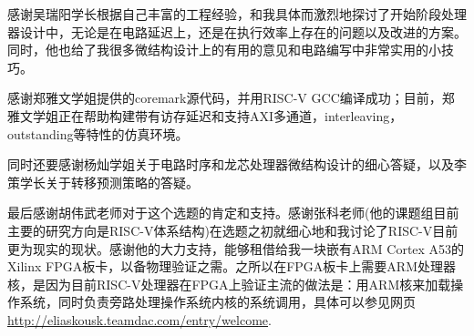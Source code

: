 
感谢吴瑞阳学长根据自己丰富的工程经验，和我具体而激烈地探讨了开始阶段处理器设计中，无论是在电路延迟上，还是在执行效率上存在的问题以及改进的方案。同时，他也给了我很多微结构设计上的有用的意见和电路编写中非常实用的小技巧。

感谢郑雅文学姐提供的coremark源代码，并用RISC-V GCC编译成功；目前，郑雅文学姐正在帮助构建带有访存延迟和支持AXI多通道，interleaving，outstanding等特性的仿真环境。

同时还要感谢杨灿学姐关于电路时序和龙芯处理器微结构设计的细心答疑，以及李策学长关于转移预测策略的答疑。

最后感谢胡伟武老师对于这个选题的肯定和支持。感谢张科老师(他的课题组目前主要的研究方向是RISC-V体系结构)在选题之初就细心地和我讨论了RISC-V目前更为现实的现状。感谢他的大力支持，能够租借给我一块嵌有ARM Cortex A53的Xilinx FPGA板卡，以备物理验证之需。之所以在FPGA板卡上需要ARM处理器核，是因为目前RISC-V处理器在FPGA上验证主流的做法是：用ARM核来加载操作系统，同时负责旁路处理操作系统内核的系统调用，具体可以参见网页\url{http://eliaskousk.teamdac.com/entry/welcome}.

\cleardoublepage[plain]%


